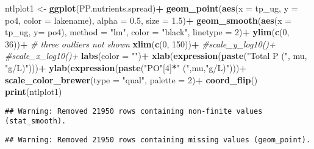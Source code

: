 \documentclass[
]{article}
\newenvironment{Shaded}{\begin{snugshade}}{\end{snugshade}}
\newcommand{\CommentTok}[1]{\textcolor[rgb]{0.56,0.35,0.01}{\textit{#1}}}
\newcommand{\DataTypeTok}[1]{\textcolor[rgb]{0.13,0.29,0.53}{#1}}
\newcommand{\DecValTok}[1]{\textcolor[rgb]{0.00,0.00,0.81}{#1}}
\newcommand{\FloatTok}[1]{\textcolor[rgb]{0.00,0.00,0.81}{#1}}
\newcommand{\KeywordTok}[1]{\textcolor[rgb]{0.13,0.29,0.53}{\textbf{#1}}}
\newcommand{\NormalTok}[1]{#1}
\newcommand{\OperatorTok}[1]{\textcolor[rgb]{0.81,0.36,0.00}{\textbf{#1}}}
\newcommand{\StringTok}[1]{\textcolor[rgb]{0.31,0.60,0.02}{#1}}
\begin{document}
\begin{Shaded}
\begin{Highlighting}[]
\NormalTok{ntlplot1 <-}\StringTok{ }\KeywordTok{ggplot}\NormalTok{(PP.nutrients.spread)}\OperatorTok{+}
\StringTok{  }\KeywordTok{geom_point}\NormalTok{(}\KeywordTok{aes}\NormalTok{(}\DataTypeTok{x =}\NormalTok{ tp_ug, }\DataTypeTok{y =}\NormalTok{ po4, }\DataTypeTok{color =}\NormalTok{ lakename), }\DataTypeTok{alpha =} \FloatTok{0.5}\NormalTok{, }\DataTypeTok{size =} \FloatTok{1.5}\NormalTok{)}\OperatorTok{+}
\StringTok{  }\KeywordTok{geom_smooth}\NormalTok{(}\KeywordTok{aes}\NormalTok{(}\DataTypeTok{x =}\NormalTok{ tp_ug, }\DataTypeTok{y=}\NormalTok{ po4), }\DataTypeTok{method =} \StringTok{"lm"}\NormalTok{, }\DataTypeTok{color =} \StringTok{"black"}\NormalTok{, }\DataTypeTok{linetype =} \DecValTok{2}\NormalTok{)}\OperatorTok{+}
\StringTok{  }\KeywordTok{ylim}\NormalTok{(}\KeywordTok{c}\NormalTok{(}\DecValTok{0}\NormalTok{, }\DecValTok{36}\NormalTok{))}\OperatorTok{+}\StringTok{ }\CommentTok{# three outliers not shown}
\StringTok{  }\KeywordTok{xlim}\NormalTok{(}\KeywordTok{c}\NormalTok{(}\DecValTok{0}\NormalTok{, }\DecValTok{150}\NormalTok{))}\OperatorTok{+}
\StringTok{  }\CommentTok{#scale_y_log10()+}
\StringTok{  }\CommentTok{#scale_x_log10()+}
\StringTok{  }\KeywordTok{labs}\NormalTok{(}\DataTypeTok{color =} \StringTok{""}\NormalTok{)}\OperatorTok{+}
\StringTok{  }\KeywordTok{xlab}\NormalTok{(}\KeywordTok{expression}\NormalTok{(}\KeywordTok{paste}\NormalTok{(}\StringTok{"Total P ("}\NormalTok{, mu, }\StringTok{"g/L)"}\NormalTok{)))}\OperatorTok{+}
\StringTok{  }\KeywordTok{ylab}\NormalTok{(}\KeywordTok{expression}\NormalTok{(}\KeywordTok{paste}\NormalTok{(}\StringTok{"PO"}\NormalTok{[}\DecValTok{4}\NormalTok{]}\OperatorTok{*}\StringTok{" ("}\NormalTok{,mu,}\StringTok{"g/L)"}\NormalTok{)))}\OperatorTok{+}
\StringTok{  }\KeywordTok{scale_color_brewer}\NormalTok{(}\DataTypeTok{type =} \StringTok{"qual"}\NormalTok{, }\DataTypeTok{palette =} \DecValTok{2}\NormalTok{)}\OperatorTok{+}
\StringTok{  }\KeywordTok{coord_flip}\NormalTok{()}
\KeywordTok{print}\NormalTok{(ntlplot1)}
\end{Highlighting}
\end{Shaded}

\begin{verbatim}
## Warning: Removed 21950 rows containing non-finite values (stat_smooth).
\end{verbatim}

\begin{verbatim}
## Warning: Removed 21950 rows containing missing values (geom_point).
\end{verbatim}
\end{document}
